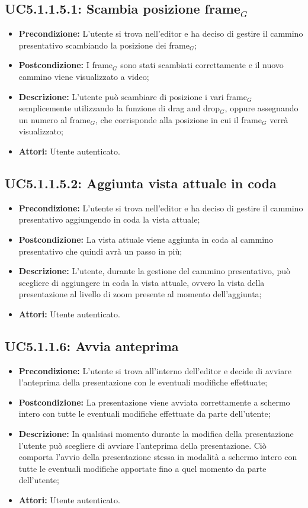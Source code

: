 \subsection{ UC5.1.1.5.1: Scambia posizione frame$_G$}

\begin{itemize}
	\item \textbf{Precondizione:} L’utente si trova nell’editor e ha deciso di gestire il cammino presentativo scambiando la posizione dei frame$_G$;
	\item \textbf{Postcondizione:} I frame$_G$ sono stati scambiati correttamente e il nuovo cammino viene visualizzato a video;
	\item \textbf{Descrizione:} L’utente può scambiare di posizione i vari frame$_G$ semplicemente utilizzando la funzione di drag and drop$_G$, oppure assegnando un numero al frame$_G$, che corrisponde alla posizione in cui il frame$_G$ verrà visualizzato;
	\item \textbf{Attori:} Utente autenticato.
\end{itemize}
\subsection{ UC5.1.1.5.2: Aggiunta vista attuale in coda}

\begin{itemize}
	\item \textbf{Precondizione:} L’utente si trova nell’editor e ha deciso di gestire il cammino presentativo aggiungendo in coda la vista attuale;
	\item \textbf{Postcondizione:} La vista attuale viene aggiunta in coda al cammino presentativo che quindi avrà un passo in più;
	\item \textbf{Descrizione:} L’utente, durante la gestione del cammino presentativo, può scegliere di aggiungere in coda la vista attuale, ovvero la vista della presentazione al livello di zoom presente al momento dell’aggiunta;
	\item \textbf{Attori:} Utente autenticato.
\end{itemize}
\subsection{ UC5.1.1.6: Avvia anteprima}

\begin{itemize}
	\item \textbf{Precondizione:} L’utente si trova all’interno dell’editor e decide di avviare l’anteprima della presentazione con le eventuali modifiche effettuate;
	\item \textbf{Postcondizione:} La presentazione viene avviata correttamente a schermo intero con tutte le eventuali modifiche effettuate da parte dell’utente;
	\item \textbf{Descrizione:} In qualsiasi momento durante la modifica della presentazione l’utente può scegliere di avviare l’anteprima della presentazione. Ciò comporta l’avvio della presentazione stessa in modalità a schermo intero con tutte le eventuali modifiche apportate fino a quel momento da parte dell’utente;
	\item \textbf{Attori:} Utente autenticato.
\end{itemize}
